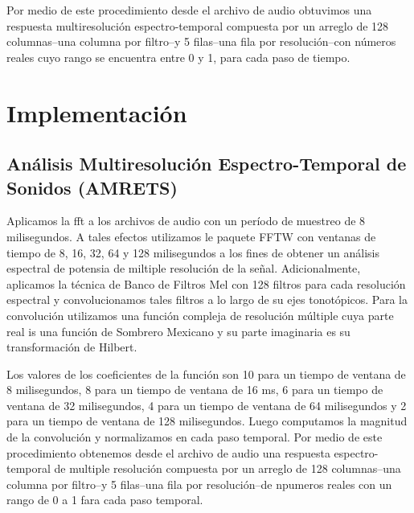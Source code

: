Por medio de este procedimiento desde el archivo de audio obtuvimos una respuesta multiresolución espectro-temporal compuesta por un arreglo de 128 columnas--una columna por filtro--y 5 filas--una fila por resolución--con números reales cuyo rango se encuentra entre 0 y 1, para cada paso de tiempo.





\section{Implementación}

\subsection{Análisis Multiresolución Espectro-Temporal de Sonidos (AMRETS)}

Aplicamos la \gls{fft} a los archivos de audio con un período de muestreo de 8 milisegundos.
A tales efectos utilizamos le paquete FFTW \cite{FFTW05, fftw} con ventanas de tiempo de 8, 16, 32, 64 y 128 milisegundos a los fines de obtener un análisis espectral de potensia de miltiple resolución de la señal.
Adicionalmente, aplicamos la técnica de Banco de Filtros Mel con 128 filtros para cada resolución espectral y convolucionamos tales filtros a lo largo de su ejes tonotópicos. Para la convolución utilizamos una función compleja de resolución múltiple cuya parte real is una función de Sombrero Mexicano y su parte imaginaria es su transformación de Hilbert.

Los valores de los coeficientes de la función son 10 para un tiempo de ventana de 8 milisegundos, 8 para un tiempo de ventana de 16 ms, 6 para un tiempo de ventana de 32 milisegundos, 4 para un tiempo de ventana de 64 milisegundos y 2 para un tiempo de ventana de 128 milisegundos.
Luego computamos la magnitud de la convolución y normalizamos en cada paso temporal.
Por medio de este procedimiento obtenemos desde el archivo de audio una respuesta espectro-temporal de multiple resolución compuesta por un arreglo de 128 columnas--una columna por filtro--y 5 filas--una fila por resolución--de npumeros reales con un rango de 0 a 1 fara cada paso temporal.



